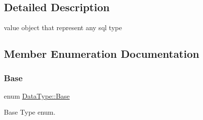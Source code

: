 \subsection{Detailed Description}
value object that represent any sql type 

\subsection{Member Enumeration Documentation}
\mbox{\label{class_data_type_a8df455d8d3949b604fbb2967dfeff239}} 
\subsubsection{\texorpdfstring{Base}{Base}}
{\footnotesize\ttfamily enum \hyperlink{class_data_type_a8df455d8d3949b604fbb2967dfeff239}{Data\+Type\+::\+Base}}



Base Type enum. 

